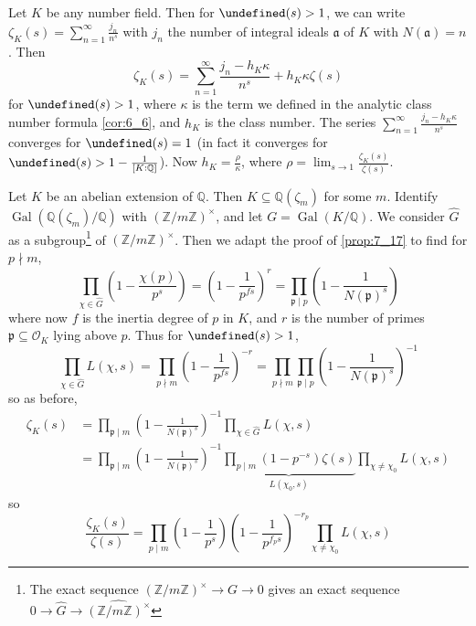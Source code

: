 \documentclass[11pt]{article}
\theoremstyle{definition}
\theoremstyle{plain}
\theoremstyle{remark}
\let\Re\undefined
\DeclareMathOperator{\Re}{Re}
\DeclareMathOperator{\Gal}{Gal}
\newcommand{\ZZ}{\mathbb{Z}}
\newcommand{\QQ}{\mathbb{Q}}
\newcommand{\cO}{\mathcal{O}}
\newcommand{\fa}{\mathfrak{a}}
\newcommand{\fp}{\mathfrak{p}}
\begin{document}
Let $K$ be any number field. Then for $\Re(s) > 1$, we can write $\zeta_K(s) = \sum_{n=1}^\infty \frac{j_n}{n^s}$ with $j_n$ the number of integral ideals $\fa$ of $K$ with $N(\fa) = n$. Then
\begin{equation*}
    \zeta_K(s) = \sum_{n=1}^\infty \frac{j_n - h_K \kappa}{n^s} + h_K \kappa \zeta(s)
\end{equation*}
for $\Re(s) > 1$, where $\kappa$ is the term we defined in the analytic class number formula \autoref{cor:6_6}, and $h_K$ is the class number. The series $\sum_{n=1}^\infty \frac{j_n - h_K \kappa}{n^s}$ converges for $\Re(s) = 1$ (in fact it converges for $\Re(s) > 1 - \frac{1}{[K : \QQ]}$). Now $h_K = \frac{\rho}{\kappa}$, where $\rho = \lim_{s \to 1} \frac{\zeta_K(s)}{\zeta(s)}$.

Let $K$ be an abelian extension of $\QQ$. Then $K \subseteq \QQ(\zeta_m)$ for some $m$. Identify $\Gal(\QQ(\zeta_m) / \QQ)$ with $(\ZZ / m\ZZ)^\times$, and let $G = \Gal(K / \QQ)$. We consider $\widehat{G}$ as a subgroup\footnote{The exact sequence $(\ZZ / m \ZZ)^\times \to G \to 0$ gives an exact sequence $0 \to \widehat{G} \to \widehat{(\ZZ / m \ZZ)^\times}$} of $(\ZZ / m\ZZ)^\times$. Then we adapt the proof of \autoref{prop:7_17} to find for $p \nmid m$,
\begin{equation*}
    \prod_{\chi \in \widehat{G}} \left(1 - \frac{\chi(p)}{p^s}\right) = \left(1 - \frac{1}{p^{fs}}\right)^r = \prod_{\fp \mid p} \left(1 - \frac{1}{N(\fp)^s}\right)
\end{equation*}
where now $f$ is the inertia degree of $p$ in $K$, and $r$ is the number of primes $\fp \subseteq \cO_K$ lying above $p$. Thus for $\Re(s) > 1$,
\begin{equation*}
    \prod_{\chi \in \widehat{G}} L(\chi, s) = \prod_{p \nmid m} \left(1 - \frac{1}{p^{fs}}\right)^{-r} = \prod_{p \nmid m} \prod_{\fp \mid p} \left(1 - \frac{1}{N(\fp)^s}\right)^{-1}
\end{equation*}
so as before,
\begin{align*}
    \zeta_K(s)
    &= \prod_{\fp \mid m} \left(1 - \frac{1}{N(\fp)^s}\right)^{-1} \prod_{\chi \in \widehat{G}} L(\chi, s)\\
    &= \prod_{\fp \mid m} \left(1 - \frac{1}{N(\fp)^s}\right)^{-1} \underbrace{\prod_{p \mid m} (1-p^{-s}) \zeta(s)}_{L(\chi_0, s)} \prod_{\chi \neq \chi_0} L(\chi, s)
\end{align*}
so
\begin{equation*}
    \frac{\zeta_K(s)}{\zeta(s)} = \prod_{p \mid m} \left(1-\frac{1}{p^s}\right) \left(1-\frac{1}{p^{f_p s}}\right)^{-r_p} \prod_{\chi \neq \chi_0} L(\chi, s)
\end{equation*}
\end{document}

